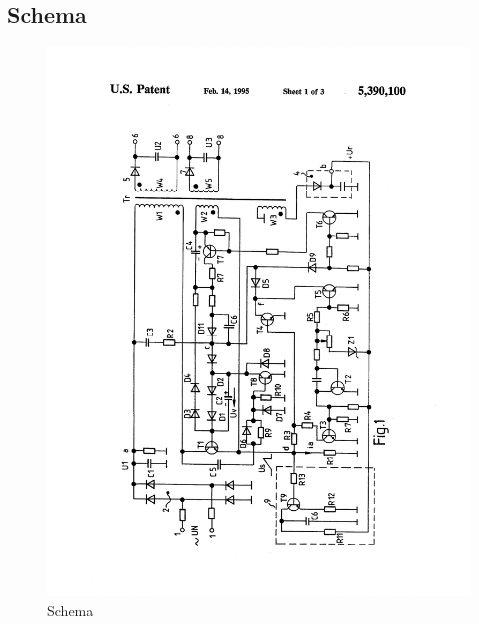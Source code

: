 \subsection{Schema}\label{subsec:Schema}
\begin{figure}[h!]
	\centering
	\includegraphics[width=1\textwidth]{graphics/Schema}
	\caption{Schema}
	\label{fig:Schema}
\end{figure} 
\newpage

